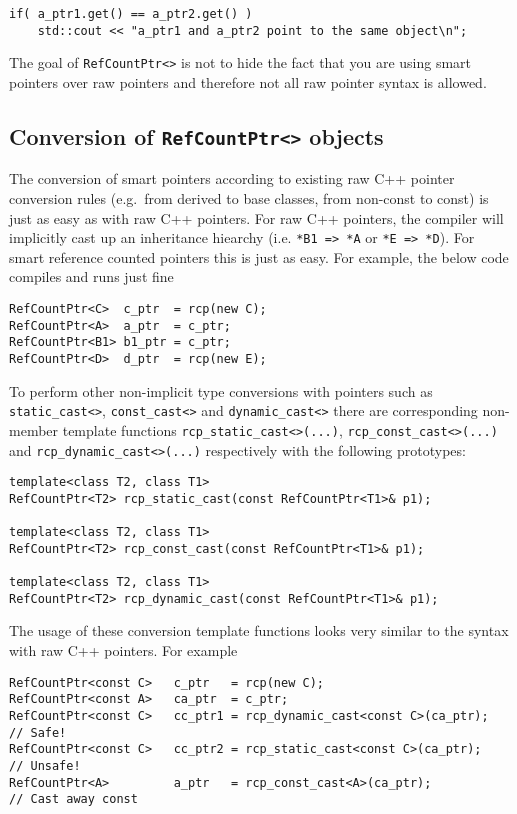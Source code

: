 {\scriptsize\begin{verbatim}
if( a_ptr1.get() == a_ptr2.get() )
    std::cout << "a_ptr1 and a_ptr2 point to the same object\n";
\end{verbatim}}

The goal of \texttt{RefCountPtr<>} is not to hide the fact that you
are using smart pointers over raw pointers and therefore not all raw
pointer syntax is allowed.

%
\subsection{Conversion of \texttt{RefCountPtr<>} objects}
%

The conversion of smart pointers according to existing raw C++ pointer
conversion rules (e.g.~from derived to base classes, from non-const to
const) is just as easy as with raw C++ pointers.  For raw C++
pointers, the compiler will implicitly cast up an inheritance hiearchy
(i.e. \texttt{*B1 => *A} or \texttt{*E => *D}).  For smart reference
counted pointers this is just as easy.  For example, the below code
compiles and runs just fine
%
{\scriptsize\begin{verbatim}
RefCountPtr<C>  c_ptr  = rcp(new C);
RefCountPtr<A>  a_ptr  = c_ptr;
RefCountPtr<B1> b1_ptr = c_ptr;
RefCountPtr<D>  d_ptr  = rcp(new E);
\end{verbatim}}
%
To perform other non-implicit type conversions with pointers such as
\texttt{static\-\_cast<>}, \texttt{const\-\_cast<>} and \texttt{dynamic\-\_cast<>} there are
corresponding non-member template functions
\texttt{rcp\-\_static\-\_cast<>(...)}, \texttt{rcp\-\_const\-\_cast<>(...)} and
\texttt{rcp\-\_dynamic\-\_cast<>(...)} respectively with the following prototypes:
%
{\scriptsize\begin{verbatim}
template<class T2, class T1>
RefCountPtr<T2> rcp_static_cast(const RefCountPtr<T1>& p1);

template<class T2, class T1>
RefCountPtr<T2> rcp_const_cast(const RefCountPtr<T1>& p1);

template<class T2, class T1>
RefCountPtr<T2> rcp_dynamic_cast(const RefCountPtr<T1>& p1);
\end{verbatim}}
%
The usage of these conversion template functions looks very similar to
the syntax with raw C++ pointers.  For example
%
{\scriptsize\begin{verbatim}
RefCountPtr<const C>   c_ptr   = rcp(new C);
RefCountPtr<const A>   ca_ptr  = c_ptr;
RefCountPtr<const C>   cc_ptr1 = rcp_dynamic_cast<const C>(ca_ptr);  // Safe!
RefCountPtr<const C>   cc_ptr2 = rcp_static_cast<const C>(ca_ptr);   // Unsafe!
RefCountPtr<A>         a_ptr   = rcp_const_cast<A>(ca_ptr);          // Cast away const
\end{verbatim}}
